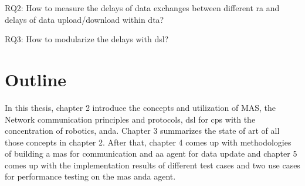 RQ2: How to measure the delays of data exchanges between different \gls{ra} and delays of data upload/download within \gls{dta}?

RQ3: How to modularize the delays with \gls{dsl}?



\section{Outline}
In this thesis, chapter 2 introduce the concepts and utilization of MAS, the Network communication principles and protocols, \gls{dsl} for \gls{cps} with the concentration of robotics, anda. Chapter 3 summarizes the state of art of all those concepts in chapter 2. After that, chapter 4 comes up with methodologies of building a \gls{mas} for communication and aa agent for data update and chapter 5 comes up with the implementation results of different test cases and two use cases for performance testing on the \gls{mas} anda agent.